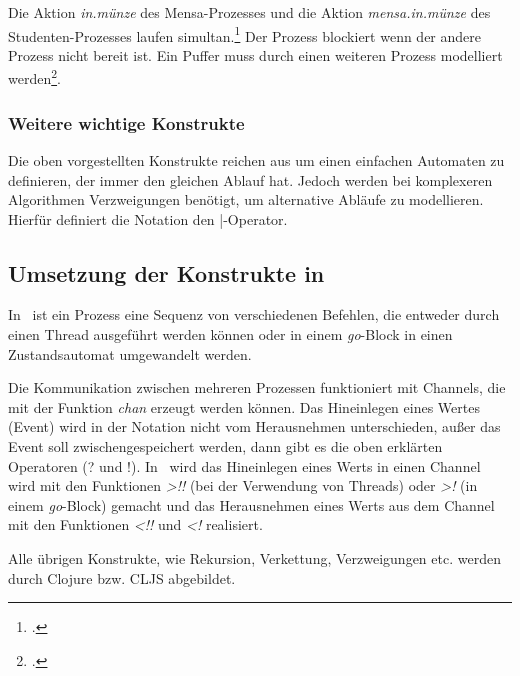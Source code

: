 Die Aktion \textit{in.münze} des Mensa-Prozesses und die Aktion \textit{mensa.in.münze} des Studenten-Prozesses laufen simultan.\footcite[vgl. Seite 117]{CSPBOOK} Der Prozess blockiert wenn der andere Prozess nicht bereit ist. Ein Puffer muss durch einen weiteren Prozess modelliert werden\footcite[vgl. Seite 133]{CSPBOOK}.


\subsubsection{Weitere wichtige Konstrukte}
Die oben vorgestellten Konstrukte reichen aus um einen einfachen Automaten zu definieren, der immer den gleichen Ablauf hat. Jedoch werden bei komplexeren Algorithmen Verzweigungen benötigt, um alternative Abläufe zu modellieren. Hierfür definiert die Notation den |-Operator.

\subsection{Umsetzung der Konstrukte in \CA}
In \CA\ ist ein Prozess eine Sequenz von verschiedenen Befehlen, die entweder durch einen Thread ausgeführt werden können oder in einem \textit{go}-Block in einen Zustandsautomat umgewandelt werden.

Die Kommunikation zwischen mehreren Prozessen funktioniert mit Channels, die mit der Funktion \textit{chan} erzeugt werden können. Das Hineinlegen eines Wertes (Event) wird in der Notation nicht vom Herausnehmen unterschieden, außer das Event soll zwischengespeichert werden, dann gibt es die oben erklärten Operatoren (? und !). In \CA\ wird das Hineinlegen eines Werts in einen Channel wird mit den Funktionen \textit{>!!} (bei der Verwendung von Threads) oder \textit{>!} (in einem \textit{go}-Block) gemacht und das Herausnehmen eines Werts aus dem Channel mit den Funktionen \textit{<!!} und \textit{<!} realisiert.

Alle übrigen Konstrukte, wie Rekursion, Verkettung, Verzweigungen etc. werden durch Clojure bzw. \acl{CLJS} abgebildet.